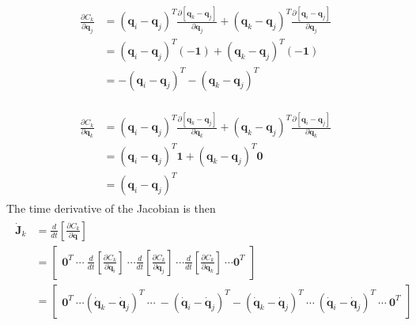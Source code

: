 \begin{eqnarray}
    \begin{split}
    \frac{\partial C_k}{\partial \mathbf{q}_j} & = (\mathbf{q}_i -
    \mathbf{q}_j)^T
    \frac{\partial [\mathbf{q}_k - \mathbf{q}_j]}{\partial \mathbf{q}_j} +
    (\mathbf{q}_k - \mathbf{q}_j)^T
    \frac{\partial [\mathbf{q}_i - \mathbf{q}_j]}{\partial \mathbf{q}_j} \\
    & =
    (\mathbf{q}_i - \mathbf{q}_j)^T (\mathbf{-1}) + (\mathbf{q}_k - \mathbf{q}_j)^T (\mathbf{-1}) \\
    & = 
    -(\mathbf{q}_i - \mathbf{q}_j)^T - (\mathbf{q}_k - \mathbf{q}_j)^T
    \end{split}
\end{eqnarray}

\begin{eqnarray}
    \begin{split}
    \frac{\partial C_k}{\partial \mathbf{q}_k} & = (\mathbf{q}_i -
    \mathbf{q}_j)^T
    \frac{\partial [\mathbf{q}_k - \mathbf{q}_j]}{\partial \mathbf{q}_k} +
    (\mathbf{q}_k - \mathbf{q}_j)^T
    \frac{\partial [\mathbf{q}_i - \mathbf{q}_j]}{\partial \mathbf{q}_k} \\
    & =
    (\mathbf{q}_i - \mathbf{q}_j)^T \mathbf{1} + (\mathbf{q}_k - \mathbf{q}_j)^T \mathbf{0} \\
    & = 
    (\mathbf{q}_i - \mathbf{q}_j)^T
    \end{split}
\end{eqnarray}
The time derivative of the Jacobian is then
\begin{eqnarray}
	\label{Eqn:DJacobianFixedAngleConstraint}
	\begin{split}
	\dot{\mathbf{J}}_k & = \frac{d}{dt}[\frac{\partial C_k}{\partial \mathbf{q}}] \\ 
    & = 
	\begin{bmatrix}
		\mathbf{0}^T \: \cdots \: \frac{d}{dt}[\frac{\partial
		C_k}{\partial \mathbf{q}_i}] \: \cdots \frac{d}{dt}[\frac{\partial
		C_k}{\partial \mathbf{q}_j}] \: \cdots \frac{d}{dt}[\frac{\partial
		C_k}{\partial \mathbf{q}_k}] \: \cdots \mathbf{0}^T     
	\end{bmatrix} \\
    & =
    \begin{bmatrix}
        \mathbf{0}^T \: \cdots (\dot{\mathbf{q}}_k - \dot{\mathbf{q}}_j)^T \: \cdots \:
        -(\dot{\mathbf{q}}_i - \dot{\mathbf{q}}_j)^T - (\dot{\mathbf{q}}_k - \dot{\mathbf{q}}_j)^T \:
        \cdots \: (\dot{\mathbf{q}}_i - \dot{\mathbf{q}}_j)^T \: \cdots \: \mathbf{0}^T
    \end{bmatrix}
    \end{split}
\end{eqnarray}

